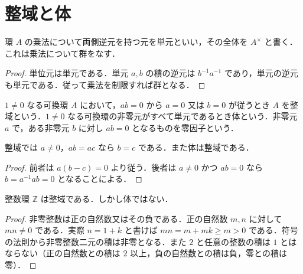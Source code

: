 \section{整域と体}
\begin{defn}[単元群]
環 $A$ の乗法について両側逆元を持つ元を単元といい，その全体を $A^\times$ と書く．これは乗法について群をなす．
\end{defn}
\begin{proof}
単位元は単元である．単元 $a,b$ の積の逆元は $b^{-1}a^{-1}$ であり，単元の逆元も単元である．従って乗法を制限すれば群となる．
\end{proof}
\begin{defn}[整域と体]
$1\ne0$ なる可換環 $A$ において，$ab=0$ から $a=0$ 又は $b=0$ が従うとき $A$ を整域という．$1\ne0$ なる可換環の非零元がすべて単元であるとき体という．非零元 $a$ で，ある非零元 $b$ に対し $ab=0$ となるものを零因子という．
\end{defn}
\begin{prop}[整域の簡約律と体の整域性]
整域では $a\ne0$，$ab=ac$ なら $b=c$ である．また体は整域である．
\end{prop}
\begin{proof}
前者は $a(b-c)=0$ より従う．後者は $a\ne0$ かつ $ab=0$ なら $b=a^{-1}ab=0$ となることによる．
\end{proof}
\begin{prop}[整数環は整域]
整数環 $\mathbb Z$ は整域である．しかし体ではない．
\end{prop}
\begin{proof}
非零整数は正の自然数又はその負である．正の自然数 $m,n$ に対して $mn\ne0$ である．実際 $n=1+k$ と書けば $mn=m+mk\geq m>0$ である．符号の法則から非零整数二元の積は非零となる．また $2$ と任意の整数の積は $1$ とはならない（正の自然数との積は $2$ 以上，負の自然数との積は負，零との積は零）．
\end{proof}
